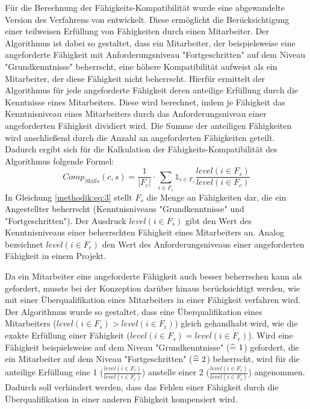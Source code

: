 Für die Berechnung der Fähigkeits-Kompatibilität wurde eine abgewandelte Version des Verfahrens von \textcite[S. 269ff.]{pizzato:2:inproceedings} entwickelt.
Diese ermöglicht die Berücksichtigung einer teilweisen Erfüllung von Fähigkeiten durch einen Mitarbeiter.
Der Algorithmus ist dabei so gestaltet, dass ein Mitarbeiter, der beispielsweise eine angeforderte Fähigkeit mit Anforderungsniveau "Fortgeschritten" auf dem Niveau "Grundkenntnisse" beherrscht, eine höhere Kompatibilität aufweist als ein Mitarbeiter, der diese Fähigkeit nicht beherrscht.
Hierfür ermittelt der Algorithmus für jede angeforderte Fähigkeit deren anteilige Erfüllung durch die Kenntnisse eines Mitarbeiters.
Diese wird berechnet, indem je Fähigkeit das Kenntnisniveau eines Mitarbeiters durch das Anforderungsniveau einer angeforderten Fähigkeit dividiert wird.
Die Summe der anteiligen Fähigkeiten wird anschließend durch die Anzahl an angeforderten Fähigkeiten geteilt.
Dadurch ergibt sich für die Kalkulation der Fähigkeits-Kompatibilität des Algorithmus folgende Formel:
\begin{equation}\label{methodik:eq:3}
    Comp_{Skills}(c,s)=\frac{1}{|F_{c}|} \cdot \sum\limits_{i \in F_{c}} \mathbb{1}_{i \in F_{s}} \frac{level(i \in F_{s})}{level(i \in F_{c})}
\end{equation}
In Gleichung \ref{methodik:eq:3} stellt $F_{s}$ die Menge an Fähigkeiten dar, die ein Angestellter beherrscht (Kenntnisniveaus "Grundkenntnisse" und "Fortgeschritten").
Der Ausdruck $level(i \in F_{s})$ gibt den Wert des Kenntnisniveaus einer beherrschten Fähigkeit eines Mitarbeiters an.
Analog bezeichnet $level(i \in F_{c})$ den Wert des Anforderungsniveaus einer angeforderten Fähigkeit in einem Projekt.

Da ein Mitarbeiter eine angeforderte Fähigkeit auch besser beherrschen kann als gefordert, musste bei der Konzeption darüber hinaus berücksichtigt werden, wie mit einer Überqualifikation eines Mitarbeiters in einer Fähigkeit verfahren wird.
Der Algorithmus wurde so gestaltet, dass eine Überqualifikation eines Mitarbeiters ($level(i \in F_{s}) > level(i \in F_{c})$) gleich gehandhabt wird, wie die exakte Erfüllung einer Fähigkeit ($level(i \in F_{s}) = level(i \in F_{c})$).
Wird eine Fähigkeit beispielsweise auf dem Niveau "Grundkenntnisse" ($\widehat{=} \textnormal{ }1$) gefordert, die ein Mitarbeiter auf dem Niveau "Fortgeschritten" ($\widehat{=} \textnormal{ }2$) beherrscht, wird für die anteilige Erfüllung eine 1 ($\frac{level(i \in F_{c})}{level(i \in F_{c})}$) anstelle einer 2 ($\frac{level(i \in F_{s})}{level(i \in F_{c})}$) angenommen.
Dadurch soll verhindert werden, dass das Fehlen einer Fähigkeit durch die Überqualifikation in einer anderen Fähigkeit kompensiert wird.

